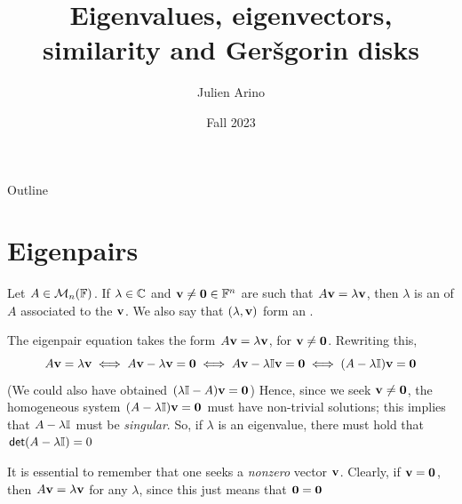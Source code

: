 \documentclass[aspectratio=169]{beamer}
\title{Eigenvalues, eigenvectors, similarity and Ger\v{s}gorin disks}
\author{Julien Arino}
\date{Fall 2023}
\begin{document}
\begin{frame}
	\titlepage
\end{frame}
\addtocounter{page}{-1}
  
  
\begin{frame}{Outline}
	  \tableofcontents[hideallsubsections]
\end{frame}
\addtocounter{page}{-1}


\section{Eigenpairs}


\begin{frame}
\begin{definition}\label{def:eigenvalue}
Let $A\in \mathcal{M}_{n}(\mathbb{F})$. If $\lambda\in \mathbb{C}$ and $\bv\neq\b0\in \IF^n$ are such that $A\mathbf{v}=\lambda\mathbf{v}$, then $\lambda$ is an  of $A$ associated to the  $\mathbf{v}$. We also say that $(\lambda, \mathbf{v})$ form an .
\end{definition}
\end{frame}


\begin{frame}
The eigenpair equation takes the form $A\mathbf{v}= \lambda\mathbf{v}$, for $\bv\neq\b0$. Rewriting this,
\[
A\bv=\lambda\bv \iff A\bv-\lambda\bv = \b0 \iff A\bv-\lambda\II\bv=\b0\iff (A-\lambda \II)\bv=\b0
\]
(We could also have obtained $(\lambda\II-A)\bv=\b0$)
\vfill
Hence, since we seek $\bv\neq\b0$, the homogeneous system $(A-\lambda\II)\bv=\b0$ must have non-trivial solutions; this implies that $A-\lambda\mathbb{I}$ must be \emph{singular}. So, if $\lambda$ is an eigenvalue, there must hold that $\mathsf{det}(A-\lambda\mathbb{I})=0$ 
\vfill
\begin{remark}
It is essential to remember that one seeks a \emph{nonzero} vector $\mathbf{v}$. Clearly, if $\bv=\b0$, then $A\mathbf{v}=\lambda\mathbf{v}$ for any $\lambda$, since this just means that $\b0=\b0$
\end{remark}
\end{frame}
\end{document}
